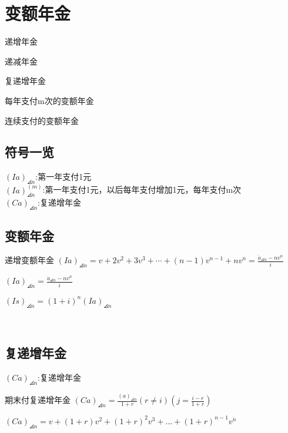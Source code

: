 \chapter{变额年金}
\begin{introduction}
	\item 递增年金
	\item 递减年金
	\item 复递增年金
	\item 每年支付m次的变额年金
	\item 连续支付的变额年金
\end{introduction}
\section{符号一览}
\noindent $(Ia)_{\angles{n}}$:第一年支付1元\\
$(Ia)^{(m)}_{\angles{n}}$:第一年支付1元，以后每年支付增加1元，每年支付m次
\\$(Ca)_{\angles{n}}$:复递增年金
\section{变额年金}
\begin{definition}{递增变额年金}
\noindent $(Ia)_{\angles{n}}=v+2 v^{2}+3 v^{3}+\cdots+(n-1) v^{n-1}+n v^{n}=\frac{\ddot{a}_{\angles{n}}-n v^{n}}{i}$
\end{definition}
\begin{remark}
	$(Ia)_{\angles{n}}=\frac{\ddot{a}_{\angles{n}}-n v^{n}}{i}$
\end{remark}
\noindent $(Is)_{\angles{n}}=(1+i)^n(Ia)_{\angles{n}}$\\
 \\
\section{复递增年金}
$(Ca)_{\angles{n}}$:复递增年金
\begin{definition}{期末付复递增年金}
\noindent $(Ca)_{\angles{n}}=\frac{(a)_{\angles{n}}}{1+r}(r\neq i)(j=\frac{i-r}{1+r})$
\end{definition}
\begin{remark}
\noindent $(Ca)_{\angles{n}}=v+(1+r)v^2+(1+r)^2v^3+\dots+ (1+r)^{n-1}v^n$
\end{remark}